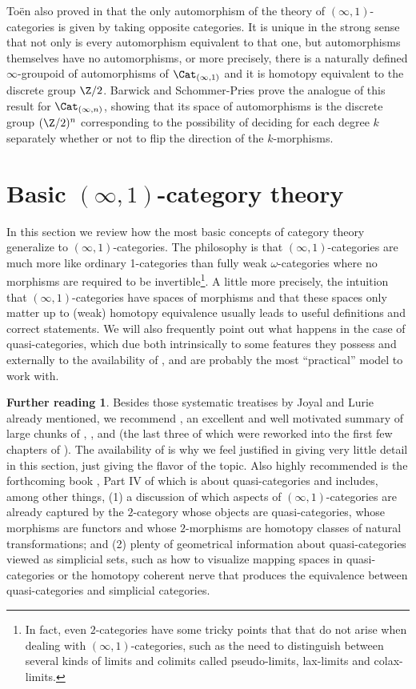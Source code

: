 \documentclass[12pt]{amsart}
\theoremstyle{definition} \newtheorem{definition}[theorem]{Definition}
\newtheorem*{further}{Further reading}
\numberwithin{equation}{section}
\newcommand{\oo}{\infty}
\newcommand{\io}{$(\oo,1)$}
\newcommand{\Catio}{\Cat_{(\oo,1)}}
\newcommand{\Catin}{\Cat_{(\oo,n)}}
\begin{document}
To\"{e}n also proved in \cite{ToenAx} that the only automorphism of
the theory of \io-categories is given by taking opposite categories.
It is unique in the strong sense that not only is every automorphism
equivalent to that one, but automorphisms themselves have no
automorphisms, or more precisely, there is a naturally defined
$\oo$-groupoid of automorphisms of $\Catio$ and it is homotopy
equivalent to the discrete group $\Z/2$. Barwick and Schommer-Pries
prove the analogue of this result for $\Catin$, showing that its
space of automorphisms is the discrete group $(\Z/2)^n$ corresponding
to the possibility of deciding for each degree $k$ separately whether
or not to flip the direction of the $k$-morphisms.

\section{Basic \io-category theory}

In this section we review how the most basic concepts of category
theory generalize to \io-categories. The philosophy is that
\io-categories are much more like ordinary 1-categories than fully
weak $\omega$-categories where no morphisms are required to be
invertible\footnote{In fact, even $2$-categories have some tricky
  points that that do not arise when dealing with \io-categories, such
  as the need to distinguish between several kinds of limits and
  colimits called pseudo-limits, lax-limits and colax-limits.}. A
little more precisely, the intuition that \io-categories have
spaces of morphisms and that these spaces only matter up to (weak)
homotopy equivalence usually leads to useful definitions and
correct statements. We will also frequently point out what happens in
the case of quasi-categories, which due both intrinsically to some
features they possess and externally to the availability of
\cite{Joyal}, \cite{HTT} and \cite{HA} are probably the most
``practical'' model to work with.

\begin{further} Besides those systematic treatises by Joyal and Lurie
already mentioned, we recommend \cite{Groth}, an excellent and well
motivated summary of large chunks of \cite{HTT}, \cite{DAG1},
\cite{DAG2} and \cite{DAG3} (the last three of which were reworked
into the first few chapters of \cite{HA}). The availability of
\cite{Groth} is why we feel justified in giving very little detail in
this section, just giving the flavor of the topic. Also highly
recommended is the forthcoming book \cite{Riehl}, Part IV of which is
about quasi-categories and includes, among other things, (1) a
discussion of which aspects of \io-categories are already captured by
the $2$-category whose objects are quasi-categories, whose morphisms
are functors and whose $2$-morphisms are homotopy classes of natural
transformations; and (2) plenty of geometrical information about
quasi-categories viewed as simplicial sets, such as how to visualize
mapping spaces in quasi-categories or the homotopy coherent nerve that
produces the equivalence between quasi-categories and simplicial
categories. \end{further}
\end{document}
